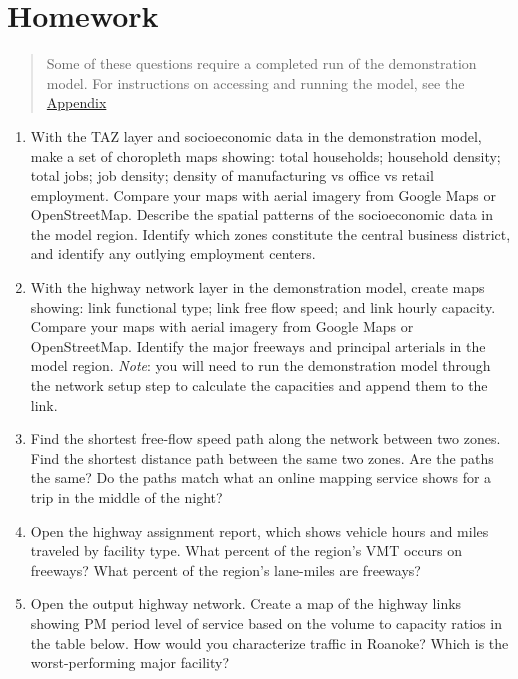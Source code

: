 \documentclass[]{book}
\begin{document}
\hypertarget{hw-blocks}{%
\section*{Homework}\label{hw-blocks}}

\begin{quote}
Some of these questions require a completed run of the demonstration model.
For instructions on accessing and running the model, see the \protect\hyperlink{app-demomodel}{Appendix}
\end{quote}

\begin{enumerate}
\def\labelenumi{\arabic{enumi}.}
\item
  With the TAZ layer and socioeconomic data in the demonstration model, make a
  set of choropleth maps showing: total households; household density; total jobs;
  job density; density of manufacturing vs office vs retail employment. Compare
  your maps with aerial imagery from Google Maps or OpenStreetMap. Describe the
  spatial patterns of the socioeconomic data in the model region. Identify which
  zones constitute the central business district, and identify any outlying
  employment centers.
\item
  With the highway network layer in the demonstration model, create maps
  showing: link functional type; link free flow speed; and link hourly capacity.
  Compare your maps with aerial imagery from Google Maps or OpenStreetMap.
  Identify the major freeways and principal arterials in the model region. \emph{Note}:
  you will need to run the demonstration model through the network setup step to
  calculate the capacities and append them to the link.
\item
  Find the shortest free-flow speed path along the network between two zones.
  Find the shortest distance path between the same two zones. Are the paths the
  same? Do the paths match what an online mapping service shows for a trip in the
  middle of the night?
\item
  Open the highway assignment report, which shows vehicle hours and miles
  traveled by facility type. What percent of the region's VMT occurs on freeways?
  What percent of the region's lane-miles are freeways?
\item
  Open the output highway network. Create a map of the
  highway links showing PM period level of service based on the volume to capacity
  ratios in the table below. How would you characterize traffic in Roanoke? Which
  is the worst-performing major facility?
\end{enumerate}
\end{document}
